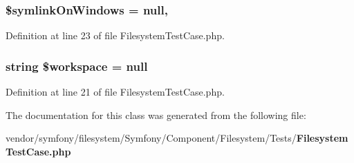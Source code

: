 \subsubsection[{\$symlink\+On\+Windows}]{\setlength{\rightskip}{0pt plus 5cm}\$symlink\+On\+Windows = null\hspace{0.3cm}{\ttfamily [static]}, {\ttfamily [protected]}}\label{class_symfony_1_1_component_1_1_filesystem_1_1_tests_1_1_filesystem_test_case_a3ad1b875a056826ce597bc2772dc156a}


Definition at line 23 of file Filesystem\+Test\+Case.\+php.

\subsubsection[{\$workspace}]{\setlength{\rightskip}{0pt plus 5cm}string \$workspace = null\hspace{0.3cm}{\ttfamily [protected]}}\label{class_symfony_1_1_component_1_1_filesystem_1_1_tests_1_1_filesystem_test_case_aedf5dc5d60be1d5c076bb9ea3402a480}


Definition at line 21 of file Filesystem\+Test\+Case.\+php.



The documentation for this class was generated from the following file\+:\begin{DoxyCompactItemize}
\item 
vendor/symfony/filesystem/\+Symfony/\+Component/\+Filesystem/\+Tests/{\bf Filesystem\+Test\+Case.\+php}\end{DoxyCompactItemize}
